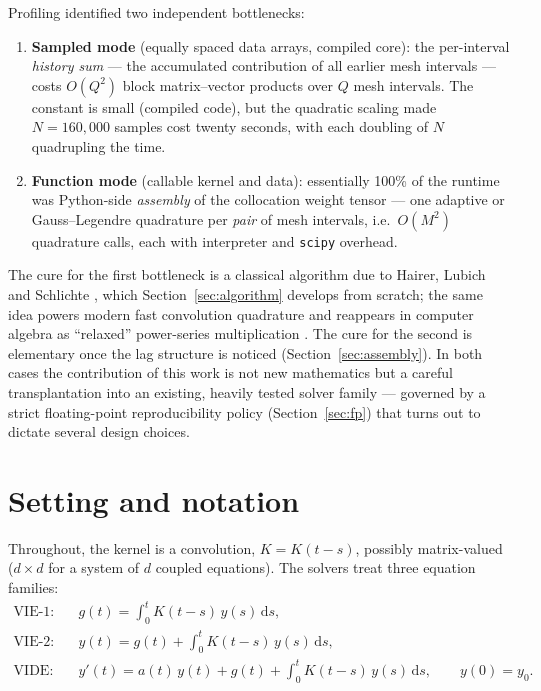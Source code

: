 \documentclass[11pt]{article}
\newcommand{\dd}{\,\mathrm{d}}
\begin{document}
Profiling identified two independent bottlenecks:
\begin{enumerate}
\item \textbf{Sampled mode} (equally spaced data arrays, compiled
  core): the per-interval \emph{history sum} --- the accumulated
  contribution of all earlier mesh intervals --- costs $O(Q^2)$ block
  matrix--vector products over $Q$ mesh intervals. The constant is small
  (compiled code), but the quadratic scaling made $N=160{,}000$ samples
  cost twenty seconds, with each doubling of $N$ quadrupling the time.
\item \textbf{Function mode} (callable kernel and data): essentially
  100\% of the runtime was Python-side \emph{assembly} of the
  collocation weight tensor --- one adaptive or Gauss--Legendre
  quadrature per \emph{pair} of mesh intervals, i.e.\ $O(M^2)$
  quadrature calls, each with interpreter and \texttt{scipy} overhead.
\end{enumerate}

The cure for the first bottleneck is a classical algorithm due to
Hairer, Lubich and Schlichte \cite{hls1985}, which Section~\ref{sec:algorithm}
develops from scratch; the same idea powers modern fast convolution
quadrature \cite{schadle2006} and reappears in computer algebra as
``relaxed'' power-series multiplication \cite{vdh2002}. The cure for the
second is elementary once the lag structure is noticed
(Section~\ref{sec:assembly}). In both cases the contribution of this
work is not new mathematics but a careful transplantation into an
existing, heavily tested solver family --- governed by a strict
floating-point reproducibility policy (Section~\ref{sec:fp}) that turns
out to dictate several design choices.

\section{Setting and notation}
\label{sec:setting}

Throughout, the kernel is a convolution, $K = K(t-s)$, possibly
matrix-valued ($d\times d$ for a system of $d$ coupled equations). The
solvers treat three equation families:
\begin{align}
\text{VIE-1:}\quad & g(t) = \int_0^t K(t-s)\,y(s)\dd s,\\
\text{VIE-2:}\quad & y(t) = g(t) + \int_0^t K(t-s)\,y(s)\dd s,\\
\text{VIDE:}\quad  & y'(t) = a(t)\,y(t) + g(t) + \int_0^t K(t-s)\,y(s)\dd s,
\qquad y(0)=y_0.
\end{align}
\end{document}
